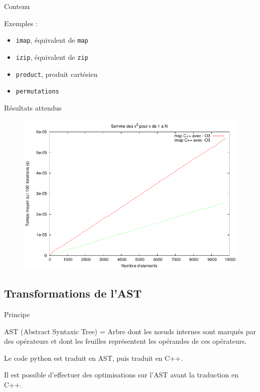 \documentclass{beamer}
\begin{document}
\begin{frame}{Contenu}

  Exemples :

  \begin{itemize}
  \item \texttt{imap}, équivalent de \texttt{map}
  \item \texttt{izip}, équivalent de \texttt{zip}
  \item \texttt{product}, produit cartésien
  \item \texttt{permutations}
  \end{itemize}

\end{frame}

\begin{frame}{Résultats attendus}

  \begin{figure}[h]
    \includegraphics[width=\textwidth]{./Pictures/MapImapCpp}
    \label{mapimap}
  \end{figure}

\end{frame}

\subsection{Transformations de l'AST}

\begin{frame}{Principe}

  AST (Abstract Syntaxic Tree) = Arbre dont les nœuds internes sont
  marqués par des opérateurs et dont les feuilles représentent les
  opérandes de ces opérateurs.

  Le code python est traduit en AST, puis traduit en C++.

  Il est possible d'effectuer des optimisations sur l'AST avant la
  traduction en C++.

\end{frame}
\end{document}
